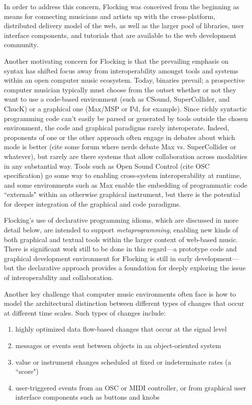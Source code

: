 \documentclass{article}
\begin{document}
In order to address this concern, Flocking was conceived from the beginning as means for connecting musicians and artists up with the cross-platform, distributed delivery model of the web, as well as the larger pool of libraries, user interface components, and tutorials that are available to the web development community.

Another motivating concern for Flocking is that the prevailing emphasis on syntax has shifted focus away from interoperability amongst tools and systems within an open computer music ecosystem. Today, binaries prevail; a prospective computer musician typically must choose from the outset whether or not they want to use a code-based environment (such as CSound, SuperCollider, and ChucK) or a graphical one (Max/MSP or Pd, for example). Since richly syntactic programming code can't easily be parsed or generated by tools outside the chosen environment, the code and graphical paradigms rarely interoperate. Indeed, proponents of one or the other approach often engage in debates about which mode is better (cite some forum where nerds debate Max vs. SuperCollider or whatever), but rarely are there systems that allow collaboration across modalities in any substantial way. Tools such as Open Sound Control (cite OSC specification) go some way to enabling cross-system interoperability at runtime, and some environments such as Max enable the embedding of programmatic code ``externals" within an otherwise graphical instrument, but there is the potential for deeper integration of the graphical and code paradigms.

Flocking's use of declarative programming idioms, which are discussed in more detail below, are intended to support {\it metaprogramming}, enabling new kinds of both graphical and textual tools within the larger context of web-based music. There is significant work still to be done in this regard---a prototype code and graphical development environment for Flocking is still in early development---but the declarative approach provides a foundation for deeply exploring the issue of interoperability and collaboration.

Another key challenge that computer music environments often face is how to model the architectural distinction between different types of changes that occur at different time scales. Such types of changes include:

\begin{enumerate}
\item highly optimized data flow-based changes that occur at the signal level
\item messages or events sent between objects in an object-oriented system
\item value or instrument changes scheduled at fixed or indeterminate rates (a ``score")
\item user-triggered events from an OSC or MIDI controller, or from graphical user interface components such as buttons and knobs
\end{enumerate}
\end{document}
